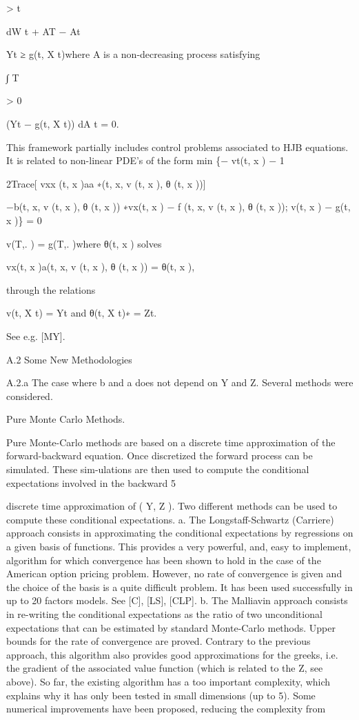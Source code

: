 \documentclass[11pt]{article}
\begin{document}
> t

dW t + AT − At

Yt ≥ g(t, X t)where A is a non-decreasing process satisfying

∫ T

> 0

(Yt − g(t, X t)) dA t = 0.

This framework partially includes control problems associated to HJB equations. It is related to non-linear PDE's of the form min \{− vt(t, x ) − 1

2Trace[ vxx (t, x )aa ∗(t, x, v (t, x ), θ (t, x ))]

−b(t, x, v (t, x ), θ (t, x )) ∗vx(t, x ) − f (t, x, v (t, x ), θ (t, x )); v(t, x ) − g(t, x )\} = 0

v(T,. ) = g(T,. )where θ(t, x ) solves

vx(t, x )a(t, x, v (t, x ), θ (t, x )) = θ(t, x ),

through the relations

v(t, X t) = Yt and θ(t, X t)∗ = Zt.

See e.g. [MY].

A.2 Some New Methodologies

A.2.a The case where b and a does not depend on Y and Z. Several methods were considered.

Pure Monte Carlo Methods.

Pure Monte-Carlo methods are based on a discrete time approximation of the forward-backward equation. Once discretized the forward process can be simulated. These sim-ulations are then used to compute the conditional expectations involved in the backward 5

discrete time approximation of ( Y, Z ). Two different methods can be used to compute these conditional expectations. a. The Longstaff-Schwartz (Carriere) approach consists in approximating the conditional expectations by regressions on a given basis of functions. This provides a very powerful, and, easy to implement, algorithm for which convergence has been shown to hold in the case of the American option pricing problem. However, no rate of convergence is given and the choice of the basis is a quite difficult problem. It has been used successfully in up to 20 factors models. See [C], [LS], [CLP]. b. The Malliavin approach consists in re-writing the conditional expectations as the ratio of two unconditional expectations that can be estimated by standard Monte-Carlo methods. Upper bounds for the rate of convergence are proved. Contrary to the previous approach, this algorithm also provides good approximations for the greeks, i.e. the gradient of the associated value function (which is related to the Z, see above). So far, the existing algorithm has a too important complexity, which explains why it has only been tested in small dimensions (up to 5). Some numerical improvements have been proposed, reducing the complexity from
\end{document}

